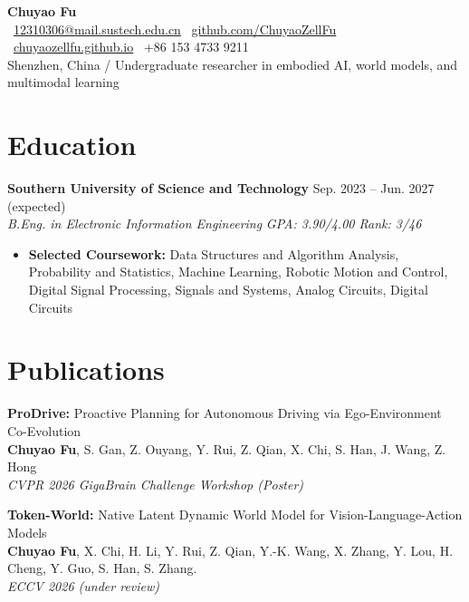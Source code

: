 \documentclass[10pt,a4paper]{article}
\newcommand{\entry}[4]{%
  \textbf{#1} \hfill #2\\
  \textit{#3} \hfill \textit{#4}\\[-0.35em]
}
\newcommand{\cvitem}[1]{\item \small #1}
\newcommand{\contactsep}{\hspace{0.7em}{\color{textgray}|}\hspace{0.7em}}
\begin{document}
{\centering
    {\LARGE\bfseries Chuyao Fu}\\[0.45em]
    {\small
    \faEnvelope\ \href{mailto:12310306@mail.sustech.edu.cn}{12310306@mail.sustech.edu.cn}
    \contactsep
    \faGithub\ \href{https://github.com/ChuyaoZellFu}{github.com/ChuyaoZellFu}
    \contactsep
    \faGlobe\ \href{https://chuyaozellfu.github.io/}{chuyaozellfu.github.io}
    \contactsep
    \faPhone\ +86 153 4733 9211
    }\\[0.3em]
    {\small \color{textgray}Shenzhen, China \;\; / \;\; Undergraduate researcher in embodied AI, world models, and multimodal learning}
\par}

\section*{Education}
\entry{Southern University of Science and Technology}{Sep. 2023 -- Jun. 2027 (expected)}{B.Eng. in Electronic Information Engineering}{GPA: 3.90/4.00 \;\; Rank: 3/46}
\begin{itemize}[leftmargin=1.2em, topsep=0.2em, itemsep=0.18em]
  \cvitem{\textbf{Selected Coursework:} Data Structures and Algorithm Analysis, Probability and Statistics, Machine Learning, Robotic Motion and Control, Digital Signal Processing, Signals and Systems, Analog Circuits, Digital Circuits}
\end{itemize}

\section*{Publications}

\noindent
\textbf{ProDrive:} Proactive Planning for Autonomous Driving via Ego-Environment Co-Evolution \\
\textbf{Chuyao Fu}, S. Gan, Z. Ouyang, Y. Rui, Z. Qian, X. Chi, S. Han, J. Wang, Z. Hong \\
\textit{CVPR 2026 GigaBrain Challenge Workshop (Poster)}

\vspace{0.9em}

\noindent

\textbf{Token-World:} Native Latent Dynamic World Model for Vision-Language-Action Models\\
\textbf{Chuyao Fu}, X. Chi, H. Li, Y. Rui, Z. Qian, Y.-K. Wang, X. Zhang, Y. Lou, H. Cheng, Y. Guo, S. Han, S. Zhang.\\
\textit{ECCV 2026 (under review)}
\end{document}

